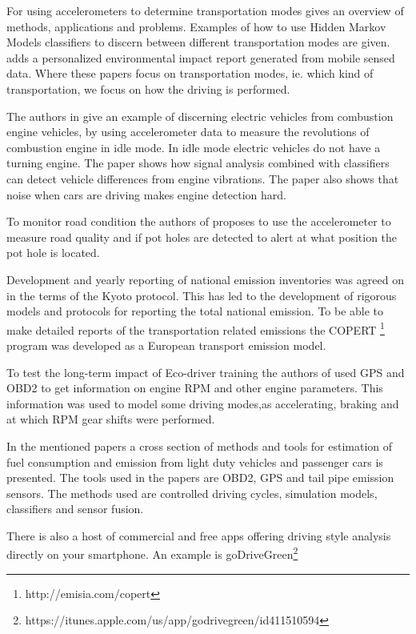 \documentclass[conference]{IEEEtran}
\begin{document}
For using accelerometers to determine transportation modes \cite{Hemminki2013} gives an overview of methods, applications and problems. Examples of how to use Hidden Markov Models classifiers to discern between different transportation modes are given. \cite{mun_peir_2009} adds a personalized environmental impact report generated from mobile sensed data. Where these papers focus on transportation modes, ie. which kind of transportation, we focus on how the driving is performed.

The authors in \cite{markus2014} give an example of discerning electric vehicles from combustion engine vehicles, by using accelerometer data to measure the revolutions of combustion engine in idle mode. In idle mode electric vehicles do not have a turning engine. The paper shows how signal analysis combined with classifiers can detect vehicle differences from engine vibrations. The paper also shows that noise when cars are driving makes engine detection hard.

To monitor road condition the authors of \cite{ghose2012road} proposes to use the accelerometer to measure road quality and if pot holes are detected to alert at what position the pot hole is located.

Development and yearly reporting of national emission inventories was agreed on in the terms of the Kyoto protocol. This has led to the development of rigorous models and protocols for reporting the total national emission. To be able to make detailed reports of the transportation related emissions the COPERT \footnote{http://emisia.com/copert} \cite{Mellios2011} program was developed as a European transport emission model.

To test the long-term impact of Eco-driver training the authors of \cite{beusen2009using} used GPS and OBD2 to get information on engine RPM and other engine parameters. This information was used to model some driving modes,as accelerating, braking and at which RPM gear shifts were performed.

In the mentioned papers a cross section of methods and tools for estimation of fuel consumption and emission from light duty vehicles and passenger cars is presented. The tools used in the papers are OBD2, GPS and tail pipe emission sensors. The methods used are controlled driving cycles, simulation models, classifiers and sensor fusion.

There is also a host of commercial and free apps offering driving style analysis directly on your smartphone. An example is goDriveGreen\footnote{https://itunes.apple.com/us/app/godrivegreen/id411510594}
 
\end{document}
